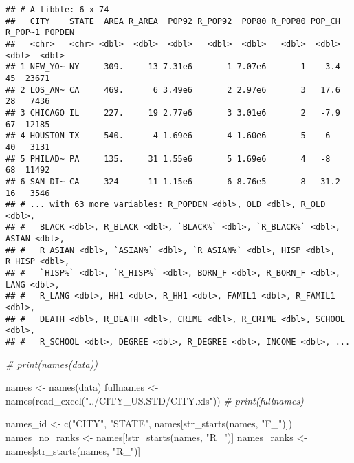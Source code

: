\documentclass[
]{article}
\newenvironment{Shaded}{\begin{snugshade}}{\end{snugshade}}
\newcommand{\CommentTok}[1]{\textcolor[rgb]{0.56,0.35,0.01}{\textit{#1}}}
\newcommand{\FunctionTok}[1]{\textcolor[rgb]{0.00,0.00,0.00}{#1}}
\newcommand{\NormalTok}[1]{#1}
\newcommand{\OtherTok}[1]{\textcolor[rgb]{0.56,0.35,0.01}{#1}}
\newcommand{\SpecialCharTok}[1]{\textcolor[rgb]{0.00,0.00,0.00}{#1}}
\newcommand{\StringTok}[1]{\textcolor[rgb]{0.31,0.60,0.02}{#1}}
\begin{document}
\begin{verbatim}
## # A tibble: 6 x 74
##   CITY    STATE  AREA R_AREA  POP92 R_POP92  POP80 R_POP80 POP_CH R_POP~1 POPDEN
##   <chr>   <chr> <dbl>  <dbl>  <dbl>   <dbl>  <dbl>   <dbl>  <dbl>   <dbl>  <dbl>
## 1 NEW_YO~ NY     309.     13 7.31e6       1 7.07e6       1    3.4      45  23671
## 2 LOS_AN~ CA     469.      6 3.49e6       2 2.97e6       3   17.6      28   7436
## 3 CHICAGO IL     227.     19 2.77e6       3 3.01e6       2   -7.9      67  12185
## 4 HOUSTON TX     540.      4 1.69e6       4 1.60e6       5    6        40   3131
## 5 PHILAD~ PA     135.     31 1.55e6       5 1.69e6       4   -8        68  11492
## 6 SAN_DI~ CA     324      11 1.15e6       6 8.76e5       8   31.2      16   3546
## # ... with 63 more variables: R_POPDEN <dbl>, OLD <dbl>, R_OLD <dbl>,
## #   BLACK <dbl>, R_BLACK <dbl>, `BLACK%` <dbl>, `R_BLACK%` <dbl>, ASIAN <dbl>,
## #   R_ASIAN <dbl>, `ASIAN%` <dbl>, `R_ASIAN%` <dbl>, HISP <dbl>, R_HISP <dbl>,
## #   `HISP%` <dbl>, `R_HISP%` <dbl>, BORN_F <dbl>, R_BORN_F <dbl>, LANG <dbl>,
## #   R_LANG <dbl>, HH1 <dbl>, R_HH1 <dbl>, FAMIL1 <dbl>, R_FAMIL1 <dbl>,
## #   DEATH <dbl>, R_DEATH <dbl>, CRIME <dbl>, R_CRIME <dbl>, SCHOOL <dbl>,
## #   R_SCHOOL <dbl>, DEGREE <dbl>, R_DEGREE <dbl>, INCOME <dbl>, ...
\end{verbatim}

\begin{Shaded}
\begin{Highlighting}[]
\CommentTok{\# print(names(data))}
\end{Highlighting}
\end{Shaded}

\begin{Shaded}
\begin{Highlighting}[]
\NormalTok{names }\OtherTok{\textless{}{-}} \FunctionTok{names}\NormalTok{(data)}
\NormalTok{fullnames }\OtherTok{\textless{}{-}} \FunctionTok{names}\NormalTok{(}\FunctionTok{read\_excel}\NormalTok{(}\StringTok{"../CITY\_US.STD/CITY.xls"}\NormalTok{))}
\CommentTok{\# print(fullnames)}

\NormalTok{names\_id }\OtherTok{\textless{}{-}} \FunctionTok{c}\NormalTok{(}\StringTok{"CITY"}\NormalTok{, }\StringTok{"STATE"}\NormalTok{, names[}\FunctionTok{str\_starts}\NormalTok{(names, }\StringTok{"F\_"}\NormalTok{)])}
\NormalTok{names\_no\_ranks }\OtherTok{\textless{}{-}}\NormalTok{ names[}\SpecialCharTok{!}\FunctionTok{str\_starts}\NormalTok{(names, }\StringTok{"R\_"}\NormalTok{)]}
\NormalTok{names\_ranks }\OtherTok{\textless{}{-}}\NormalTok{ names[}\FunctionTok{str\_starts}\NormalTok{(names, }\StringTok{"R\_"}\NormalTok{)]}
\end{Highlighting}
\end{Shaded}
\end{document}
